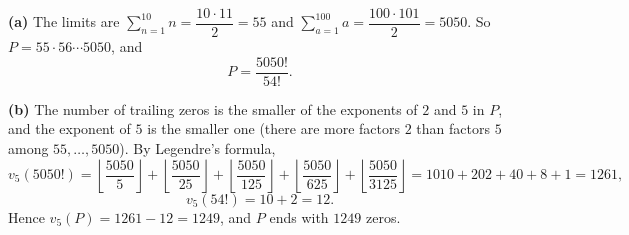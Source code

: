 \textbf{(a)} The limits are $\sum_{n=1}^{10}n=\dfrac{10\cdot11}{2}=55$ and $\sum_{a=1}^{100}a=\dfrac{100\cdot101}{2}=5050$. So $P=55\cdot56\cdots5050$, and
\[
P=\boxed{\dfrac{5050!}{54!}} .
\]

\textbf{(b)} The number of trailing zeros is the smaller of the exponents of $2$ and $5$ in $P$, and the exponent of $5$ is the smaller one (there are more factors $2$ than factors $5$ among $55,\dots,5050$). By Legendre's formula,
\[
v_5(5050!)=\left\lfloor\dfrac{5050}{5}\right\rfloor+\left\lfloor\dfrac{5050}{25}\right\rfloor+\left\lfloor\dfrac{5050}{125}\right\rfloor+\left\lfloor\dfrac{5050}{625}\right\rfloor+\left\lfloor\dfrac{5050}{3125}\right\rfloor=1010+202+40+8+1=1261,
\]
\[
v_5(54!)=10+2=12 .
\]
Hence $v_5(P)=1261-12=1249$, and $P$ ends with $\boxed{1249}$ zeros.
